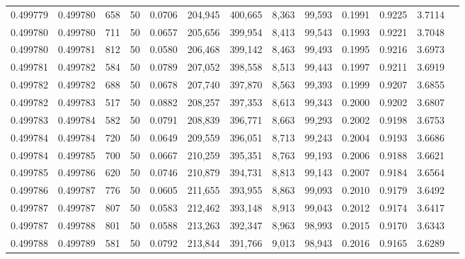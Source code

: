 \begin{tabular}{rrrrrrrrrrrrr}
0.499779 & 0.499780 &   658 &  50 &                                     0.0706 & 204,945 & 400,665 &   8,363 &  99,593 & 0.1991 & 0.9225 & 3.7114 \\
0.499780 & 0.499780 &   711 &  50 &                                     0.0657 & 205,656 & 399,954 &   8,413 &  99,543 & 0.1993 & 0.9221 & 3.7048 \\
0.499780 & 0.499781 &   812 &  50 &                                     0.0580 & 206,468 & 399,142 &   8,463 &  99,493 & 0.1995 & 0.9216 & 3.6973 \\
0.499781 & 0.499782 &   584 &  50 &                                     0.0789 & 207,052 & 398,558 &   8,513 &  99,443 & 0.1997 & 0.9211 & 3.6919 \\
0.499782 & 0.499782 &   688 &  50 &                                     0.0678 & 207,740 & 397,870 &   8,563 &  99,393 & 0.1999 & 0.9207 & 3.6855 \\
0.499782 & 0.499783 &   517 &  50 &                                     0.0882 & 208,257 & 397,353 &   8,613 &  99,343 & 0.2000 & 0.9202 & 3.6807 \\
0.499783 & 0.499784 &   582 &  50 &                                     0.0791 & 208,839 & 396,771 &   8,663 &  99,293 & 0.2002 & 0.9198 & 3.6753 \\
0.499784 & 0.499784 &   720 &  50 &                                     0.0649 & 209,559 & 396,051 &   8,713 &  99,243 & 0.2004 & 0.9193 & 3.6686 \\
0.499784 & 0.499785 &   700 &  50 &                                     0.0667 & 210,259 & 395,351 &   8,763 &  99,193 & 0.2006 & 0.9188 & 3.6621 \\
0.499785 & 0.499786 &   620 &  50 &                                     0.0746 & 210,879 & 394,731 &   8,813 &  99,143 & 0.2007 & 0.9184 & 3.6564 \\
0.499786 & 0.499787 &   776 &  50 &                                     0.0605 & 211,655 & 393,955 &   8,863 &  99,093 & 0.2010 & 0.9179 & 3.6492 \\
0.499787 & 0.499787 &   807 &  50 &                                     0.0583 & 212,462 & 393,148 &   8,913 &  99,043 & 0.2012 & 0.9174 & 3.6417 \\
0.499787 & 0.499788 &   801 &  50 &                                     0.0588 & 213,263 & 392,347 &   8,963 &  98,993 & 0.2015 & 0.9170 & 3.6343 \\
0.499788 & 0.499789 &   581 &  50 &                                     0.0792 & 213,844 & 391,766 &   9,013 &  98,943 & 0.2016 & 0.9165 & 3.6289 \\

\end{tabular}
